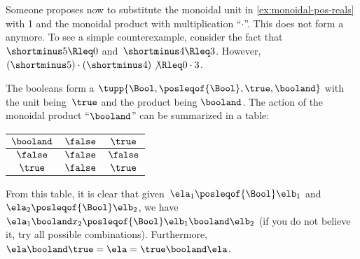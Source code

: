 \begin{counterexample}
    Someone proposes now to substitute the monoidal unit in \cref{ex:monoidal-pos-reals} with 1 and the monoidal product with multiplication ``$\cdot$''.
    This does not form a  anymore.
    To see a simple counterexample, consider the fact that~$\shortminus  5\Rleq 0$ and~$\shortminus   4\Rleq 3$.
    However,~$(\shortminus  5)\cdot (\shortminus   4) \not{\Rleq} 0 \cdot 3$.
\end{counterexample}

\begin{example}
    The booleans form a  $\tupp{\Bool,\posleqof{\Bool},\true,\booland}$
    with the unit being~$\true$ and the product being $\booland$.
    The action of the monoidal product ``$\booland$'' can be summarized in a table:
    \begin{center}
        \begin{tabular}{c|cc}
            $\booland$ & $\false$ & $\true$ \\
            \hline
            $\false$   & $\false$ & $\false$ \\
            $\true$    & $\false$ & $\true$
        \end{tabular}
    \end{center}
    From this table, it is clear that given~$\ela_1\posleqof{\Bool}\elb_1$ and~$\ela_2\posleqof{\Bool} \elb_2$, we have~$\ela_1\booland x_2\posleqof{\Bool} \elb_1\booland \elb_2$ (if you do not believe it, try all possible combinations).
    Furthermore,~$\ela\booland \true=\ela=\true \booland \ela$.
\end{example}

